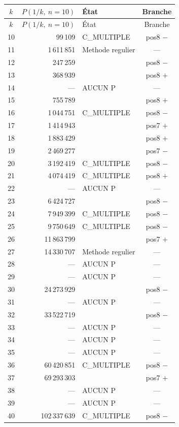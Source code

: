 \documentclass[11pt,a4paper]{article}
\begin{document}
{\small
\begin{longtable}{@{}c r l c@{}}
\toprule
\rowcolor{spectralgris}
$k$ & $P(1/k,\ n=10)$ & État & Branche \\
\midrule
\endfirsthead
\toprule
\rowcolor{spectralgris}
$k$ & $P(1/k,\ n=10)$ & État & Branche \\
\midrule
\endhead
10 & 99\,109 & C\_MULTIPLE & pos8 $-$ \\
11 & 1\,611\,851 & Methode regulier & --- \\
12 & 247\,259 & & pos8 $-$ \\
13 & 368\,939 & & pos8 $+$ \\
14 & --- & AUCUN P & --- \\
15 & 755\,789 & & pos8 $+$ \\
16 & 1\,044\,751 & C\_MULTIPLE & pos8 $-$ \\
17 & 1\,414\,943 & & pos7 $+$ \\
18 & 1\,883\,429 & & pos8 $+$ \\
19 & 2\,469\,277 & & pos7 $-$ \\
20 & 3\,192\,419 & C\_MULTIPLE & pos8 $-$ \\
21 & 4\,074\,419 & C\_MULTIPLE & pos8 $+$ \\
22 & --- & AUCUN P & --- \\
23 & 6\,424\,727 & & pos8 $-$ \\
24 & 7\,949\,399 & C\_MULTIPLE & pos8 $-$ \\
25 & 9\,750\,649 & C\_MULTIPLE & pos8 $-$ \\
26 & 11\,863\,799 & & pos7 $+$ \\
27 & 14\,330\,707 & Methode regulier & --- \\
28 & --- & AUCUN P & --- \\
29 & --- & AUCUN P & --- \\
30 & 24\,273\,929 & & pos8 $-$ \\
31 & --- & AUCUN P & --- \\
32 & 33\,522\,719 & & pos8 $-$ \\
33 & --- & AUCUN P & --- \\
34 & --- & AUCUN P & --- \\
35 & --- & AUCUN P & --- \\
36 & 60\,420\,851 & C\_MULTIPLE & pos8 $-$ \\
37 & 69\,293\,303 & & pos7 $+$ \\
38 & --- & AUCUN P & --- \\
39 & --- & AUCUN P & --- \\
40 & 102\,337\,639 & C\_MULTIPLE & pos8 $-$ \\

\end{longtable}}
\end{document}
